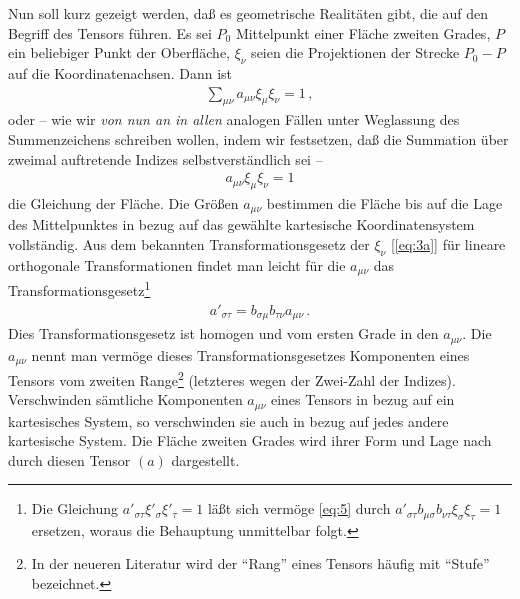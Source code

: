 Nun soll kurz gezeigt werden, daß es geometrische Realitäten gibt, die auf den 
Begriff des Tensors führen. Es sei $P_0$ Mittelpunkt einer Fläche zweiten 
Grades, $P$ ein beliebiger Punkt der Oberfläche, $\xi_{\nu}$ seien die 
Projektionen der Strecke $P_0 - P$ auf die Koordinatenachsen. Dann ist
\begin{align*}
\sum_{\mu\nu} a_{\mu\nu} \xi_{\mu} \xi_{\nu}  = 1\, ,
\end{align*}
oder -- wie wir \emph{von nun an in allen} analogen Fällen unter Weglassung des 
Summenzeichens schreiben wollen, indem wir festsetzen, daß die Summation über 
zweimal auftretende Indizes selbstverständlich sei --
\begin{align*}
a_{\mu\nu} \xi_{\mu} \xi_{\nu}  = 1
\end{align*}
die Gleichung der Fläche. Die Größen $a_{\mu\nu}$ bestimmen die Fläche bis auf 
die Lage des Mittelpunktes in bezug auf das gewählte kartesische 
Koordinatensystem vollständig. Aus dem bekannten Transformationsgesetz der 
$\xi_{\nu}$ [\cref{eq:3a}] für lineare orthogonale Transformationen findet man 
leicht für die $a_{\mu\nu}$ das Transformationsgesetz\footnote{Die Gleichung 
$a'_{\sigma\tau} \xi'_{\sigma} \xi'_{\tau} = 1$ läßt sich vermöge \eqref{eq:5} 
durch $a'_{\sigma\tau} b_{\mu\sigma} b_{\nu\tau} \xi_{\sigma} \xi_{\tau} = 1$ 
ersetzen, woraus die Behauptung unmittelbar folgt.}
\begin{align*}
a'_{\sigma\tau} = b_{\sigma\mu} b_{\tau\nu} a_{\mu\nu}\,.
\end{align*}
Dies Transformationsgesetz ist homogen und vom ersten Grade in den 
$a_{\mu\nu}$. Die $a_{\mu\nu}$ nennt man vermöge dieses Transformationsgesetzes 
Komponenten eines Tensors vom zweiten Range\footnote{In der neueren Literatur 
wird der \enquote{Rang} eines Tensors häufig mit \enquote{Stufe} bezeichnet.} 
(letzteres wegen der Zwei-Zahl der Indizes). Verschwinden sämtliche Komponenten 
$a_{\mu\nu}$ eines Tensors in bezug auf ein kartesisches System, so 
verschwinden sie auch in bezug auf jedes andere kartesische System. Die Fläche 
zweiten Grades wird ihrer Form und Lage nach durch diesen Tensor $(a)$ 
dargestellt.

